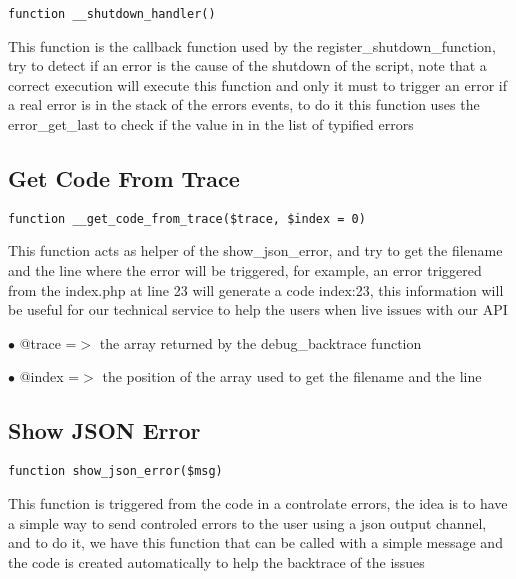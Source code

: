 \documentclass[a4paper]{book}
\begin{document}
\begin{lstlisting}
function __shutdown_handler()
\end{lstlisting}

This function is the callback function used by the register\_shutdown\_function, try to
detect if an error is the cause of the shutdown of the script, note that a correct
execution will execute this function and only it must to trigger an error if a real
error is in the stack of the errors events, to do it this function uses the error\_get\_last
to check if the value in in the list of typified errors

\hypertarget{toc106}{}
\subsection{Get Code From Trace}

\begin{lstlisting}
function __get_code_from_trace($trace, $index = 0)
\end{lstlisting}

This function acts as helper of the show\_json\_error, and try to get the filename and the line
where the error will be triggered, for example, an error triggered from the index.php at line
23 will generate a code index:23, this information will be useful for our technical service
to help the users when live issues with our API

\begin{compactitem}
\item[\color{myblue}$\bullet$] @trace =$>$ the array returned by the debug\_backtrace function
\item[\color{myblue}$\bullet$] @index =$>$ the position of the array used to get the filename and the line
\end{compactitem}

\hypertarget{toc107}{}
\subsection{Show JSON Error}

\begin{lstlisting}
function show_json_error($msg)
\end{lstlisting}

This function is triggered from the code in a controlate errors, the idea is to have
a simple way to send controled errors to the user using a json output channel, and to
do it, we have this function that can be called with a simple message and the code
is created automatically to help the backtrace of the issues
\end{document}
